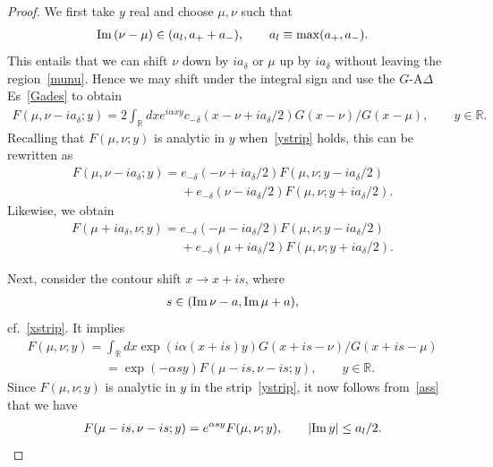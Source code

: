\documentclass[11pt]{article}
\numberwithin{equation}{section}
\newcommand{\De}{\Delta}
\newcommand{\de}{\delta}
\newcommand{\R}{{\mathbb R}}
\newcommand{\im}{{\rm Im}\, }
\begin{document}
\begin{proof}
We f\/irst take $y$ real and choose $\mu,\nu$ such that
\begin{gather}\label{ass}
\im(\nu-\mu)\in  (a_l,a_{+}+a_{-}),\qquad a_l\equiv \max(a_{+},a_{-}).
\end{gather}
This entails that we can shift $\nu$ down by $ia_{\de}$ or $\mu$ up by $ia_{\de}$ without leaving the region~\eqref{munu}. Hence we may shift under the integral sign and use the $G$-A$\De$Es~\eqref{Gades} to obtain
\begin{gather}
F(\mu,\nu-ia_{\de};y)=2\int_{\R}dxe^{i\alpha xy}c_{-\de}(x-\nu+ia_{\de}/2)G(x-\nu)/G(x-\mu),\qquad y\in\R.
\end{gather}
Recalling that $F(\mu,\nu;y)$ is analytic in $y$ when~\eqref{ystrip} holds, this can be rewritten as
\begin{gather}
F(\mu,\nu-ia_{\de};y)=e_{-\de}(-\nu+ia_{\de}/2)F(\mu,\nu;y-ia_{\de}/2)\nonumber\\
\phantom{F(\mu,\nu-ia_{\de};y)=}{}
+e_{-\de}(\nu-ia_{\de}/2)F(\mu,\nu;y+ia_{\de}/2).\label{Fs1}
\end{gather}
Likewise, we obtain
\begin{gather}
F(\mu+ia_{\de},\nu;y)=e_{-\de}(-\mu-ia_{\de}/2)F(\mu,\nu;y-ia_{\de}/2)\nonumber\\
\phantom{F(\mu+ia_{\de},\nu;y)=}{}
+e_{-\de}(\mu+ia_{\de}/2)F(\mu,\nu;y+ia_{\de}/2).\label{Fs2}
\end{gather}

Next, consider the contour shift $x\to x+is$, where
\begin{gather}
s\in (\im\nu-a,\im \mu+a),
\end{gather}
cf.~\eqref{xstrip}. It implies
\begin{gather}
F(\mu,\nu;y)     =     \int_{\R}dx\exp(i\alpha (x+is)y)G(x+is-\nu)/G(x+is-\mu)
\nonumber \\
\phantom{F(\mu,\nu;y)     =}{}  =    \exp(-\alpha sy)F(\mu-is,\nu-is;y),\qquad y\in\R.\label{xshi}
\end{gather}
Since $F(\mu,\nu;y)$ is analytic in $y$ in the strip~\eqref{ystrip}, it now follows from~\eqref{ass} that we have
\begin{gather}\label{Fkey}
F(\mu-is,\nu-is;y)=e^{\alpha sy}F(\mu,\nu;y),\qquad |\im y|\le a_l/2.
\end{gather}


\end{proof}
\end{document}
